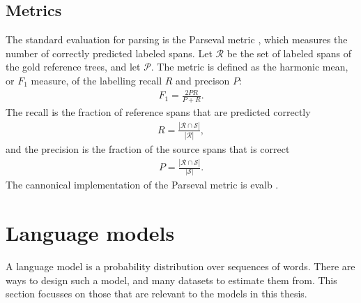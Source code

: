   \subsection{Metrics}
    The standard evaluation for parsing is the Parseval metric \citep{black1991parseval}, which measures the number of correctly predicted labeled spans. Let $\mathcal{R}$ be the set of labeled spans of the gold reference trees, and let $\mathcal{P}$. The metric is defined as the harmonic mean, or $F_1$ measure, of the labelling recall $R$ and precison $P$:
    \begin{align}
      \label{eq:fscore}
      F_1 = \frac{2 PR}{P + R}.
    \end{align}
    The recall is the fraction of reference spans that are predicted correctly
    \begin{align*}
      R = \frac{|\mathcal{R} \cap \mathcal{S}|}{|\mathcal{R}|},
    \end{align*}
    and the precision is the fraction of the source spans that is correct
    \begin{align*}
      P = \frac{|\mathcal{R} \cap \mathcal{S}|}{|\mathcal{S}|}.
    \end{align*}
    The cannonical implementation of the Parseval metric is evalb \citep{sekine1997evalb}.


\section{Language models}
  A language model is a probability distribution over sequences of words. There are ways to design such a model, and many datasets to estimate them from. This section focusses on those that are relevant to the models in this thesis.

